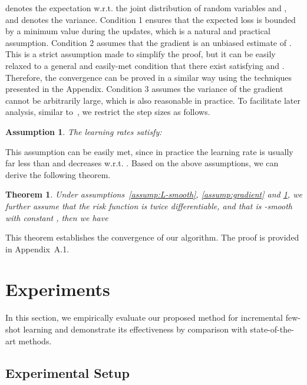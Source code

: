 \documentclass{article}
\newtheorem{assumption}{Assumption}[section]
\newtheorem{theorem}{Theorem}[section]
\begin{document}
 denotes the expectation w.r.t. the joint distribution of random variables  and , and  denotes the variance.
Condition 1 ensures that the expected loss  is bounded by a minimum value  during the updates, which is a natural and practical assumption. Condition 2 assumes that the gradient  is an unbiased estimate of . This is a strict assumption made to simplify the proof, but it can be easily relaxed to a general and easily-met condition that there exist  satisfying  and .
Therefore, the convergence can be proved in a similar way using the techniques presented in the Appendix. Condition 3 assumes the variance of the gradient  cannot be arbitrarily large, which is also reasonable in practice.
To facilitate later analysis, similar to~\citep{Robbins2007ASA}, we restrict the step sizes  as follows.

\begin{assumption}\label{assump:lr}
The learning rates satisfy:

\end{assumption}

This assumption can be easily met, since in practice the learning rate  is usually far less than  and decreases w.r.t. . Based on the above assumptions, we can derive the following theorem. 
\begin{theorem}\label{eq:theorem}
Under assumptions~\ref{assump:L-smooth}, \ref{assump:gradient} and \ref{assump:lr}, we further assume that the risk function  is twice differentiable, and that  is -smooth with constant , then we have

\end{theorem}
This theorem establishes the convergence of our algorithm. The proof is provided in Appendix~A.1. 



 \section{Experiments}\label{sec:exp}
In this section, we empirically evaluate our proposed method for incremental few-shot learning and demonstrate its effectiveness by comparison with state-of-the-art methods.

\subsection{Experimental Setup}\label{sec:exp_setup}
\end{document}
